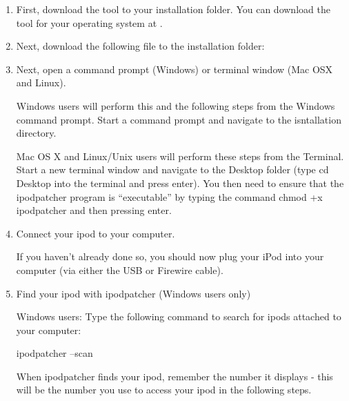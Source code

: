 \begin{enumerate} 

  \item First, download the  tool to your installation 
  folder.  You can download the  tool for your operating 
  system at .
  
  \item Next, download the following file to the installation folder: 


  \item Next, open a command prompt (Windows) or terminal window (Mac OSX and Linux).
  
    Windows users will perform this and the following steps from the Windows 
    command prompt. Start a command prompt and navigate to the isntallation 
    directory.

    Mac OS X and Linux/Unix users will perform these steps from the Terminal. 
    Start a new terminal window and navigate to the Desktop folder (type cd 
    Desktop into the terminal and press enter). You then need to ensure that the 
    ipodpatcher program is ``executable'' by typing the command chmod +x 
    ipodpatcher and then pressing enter.
  
  \item Connect your ipod to your computer.

    If you haven't already done so, you should now plug your iPod into your 
    computer (via either the USB or Firewire cable).


  \item Find your ipod with ipodpatcher (Windows users only)

    Windows users:  Type the following command to search for ipods attached to 
    your computer: 
      \begin{code} 
        ipodpatcher --scan 
      \end{code}
    
    When ipodpatcher finds your ipod, remember the number it displays - this 
    will  be the number you use to access your ipod in the following steps.


\end{enumerate}
